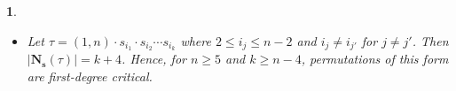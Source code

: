 \documentclass[a4 paper,12pt]{article}
\DeclareMathOperator{\Inv}{Inv}
\newtheorem{numeris}{}[section]
\begin{document}
\begin{numeris}
\begin{itemize}
	
	Analogously to the previous cases, a complete determination of the set $\Inv_{\textbf{f}}(\tau)$ shows that 	
	 $\left|\textbf{N}_{\textbf{s}}(\tau)\right| = \frac{3\cdot n -5}{2}\geq n$ for all $n\geq 5$.  Since $\left|\Inv_{\textbf{f}}(\tau)\right| = \left|\Inv_{\textbf{f}}(\omega_{n} \cdot  \eta \cdot  \omega_{n})\right|$ we have that $\tau$ and 
	 $\omega_{n} \cdot  \eta \cdot  \omega_{n} = \left(\framebox{ 3  \ 5 \ldots   n-2 \ n} \: 1\: \framebox{n-1 \  n-3   \ldots \ 4 \ 2}\right)$ are critical in $S_n$. 	
	\item[4.] Let  $\tau = (1,n)\cdot  s_{i_1} \cdot  s_{i_2} \cdots  s_{i_{k}} $ where $2\leq i_j\leq n-2$ and $i_{j}\neq i_{j'}$ for $j\neq j'$. Then $\left|\textbf{N}_{\textbf{s}}(\tau)\right| = k+4$. Hence, for $n \geq 5$ and $k \geq n-4$, 
permutations of this form are first-degree critical.
\end{itemize}
\label{citical_2}
\end{numeris}
\end{document}
